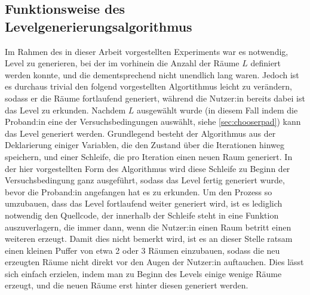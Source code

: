 \subsection{Funktionsweise des Levelgenerierungsalgorithmus}
Im Rahmen des in dieser Arbeit vorgestellten Experiments war es notwendig, Level zu generieren, bei der im vorhinein die Anzahl der Räume $L$ definiert werden konnte, und die dementsprechend nicht unendlich lang waren. Jedoch ist es durchaus trivial den folgend vorgestellten Algortithmus leicht zu verändern, sodass er die Räume fortlaufend generiert, während die Nutzer:in bereits dabei ist das Level zu erkunden.
Nachdem $L$ ausgewählt wurde (in diesem Fall indem die Proband:in eine der Versuchsbedingungen auswählt, siehe \autoref{sec:chooserpad})
kann das Level generiert werden.
Grundlegend besteht der Algorithmus aus der Deklarierung einiger Variablen, die den Zustand über die Iterationen hinweg speichern, und einer Schleife, die pro Iteration einen neuen Raum generiert. In der hier vorgestellten Form des Algorithmus wird diese Schleife zu Beginn der Versuchsbedingung ganz ausgeführt, sodass das Level fertig generiert wurde, bevor die Proband:in angefangen hat es zu erkunden.
Um den Prozess so umzubauen, dass das Level fortlaufend weiter generiert wird, ist es lediglich notwendig den Quellcode, der innerhalb der Schleife steht in eine Funktion auszuverlagern, die immer dann, wenn die Nutzer:in einen Raum betritt einen weiteren erzeugt. Damit dies nicht bemerkt wird, ist es an dieser Stelle ratsam einen kleinen Puffer von etwa 2 oder 3 Räumen einzubauen, sodass die neu erzeugten Räume nicht direkt vor den Augen der Nutzer:in auftauchen. Dies lässt sich einfach erzielen, indem man zu Beginn des Levels einige wenige Räume erzeugt, und die neuen Räume erst hinter diesen generiert werden.


